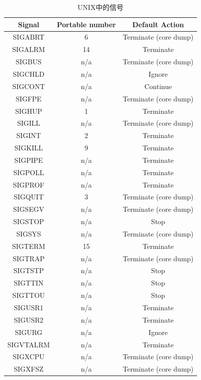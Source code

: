 \documentclass[a4paper,12pt,notitlepage]{article}
\begin{document}
\begin{table}
\centering
\begin{tabular}{|c|c|c|}

\hline
Signal & Portable number & Default Action \\
\hline
SIGABRT & 6 & Terminate (core dump) \\
\hline
SIGALRM & 14 & Terminate \\
\hline
SIGBUS & n/a & Terminate (core dump) \\
\hline
SIGCHLD & n/a & Ignore \\
\hline
SIGCONT & n/a & Continue \\
\hline
SIGFPE & n/a & Terminate (core dump) \\
\hline
SIGHUP & 1 & Terminate \\
\hline
SIGILL & n/a & Terminate (core dump) \\
\hline
SIGINT & 2 & Terminate \\
\hline
SIGKILL & 9 & Terminate \\
\hline
SIGPIPE & n/a & Terminate \\
\hline
SIGPOLL & n/a & Terminate \\
\hline
SIGPROF & n/a & Terminate \\
\hline
SIGQUIT & 3 & Terminate (core dump) \\
\hline
SIGSEGV & n/a & Terminate (core dump) \\
\hline
SIGSTOP & n/a & Stop  \\
\hline
SIGSYS & n/a & Terminate (core dump) \\
\hline
SIGTERM & 15 & Terminate \\
\hline
SIGTRAP & n/a & Terminate (core dump) \\
\hline
SIGTSTP & n/a & Stop \\
\hline
SIGTTIN & n/a & Stop \\
\hline
SIGTTOU & n/a & Stop \\
\hline
SIGUSR1 & n/a & Terminate \\
\hline
SIGUSR2 & n/a & Terminate \\
\hline
SIGURG & n/a & Ignore \\
\hline
SIGVTALRM & n/a & Terminate \\
\hline
SIGXCPU & n/a & Terminate (core dump) \\
\hline
SIGXFSZ & n/a & Terminate (core dump) \\
\hline

\end{tabular}
\caption{UNIX中的信号}
\end{table}
\end{document}
